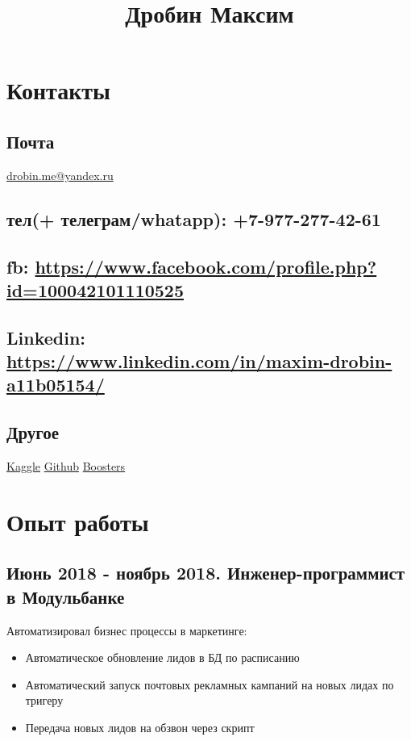 \documentclass[11pt]{article}
\date{}
\title{Дробин Максим}
\begin{document}
\maketitle
\section{Контакты}
\label{sec:org25c2c82}
\subsection{Почта}
\label{sec:orgaffa8a4}
\href{mailto:drobin.me@yandex.ru}{drobin.me@yandex.ru}

\subsection{тел(+ телеграм/whatapp): +7-977-277-42-61}
\label{sec:org64386a6}
\subsection{fb: \url{https://www.facebook.com/profile.php?id=100042101110525}}
\label{sec:org4a47960}
\subsection{Linkedin: \url{https://www.linkedin.com/in/maxim-drobin-a11b05154/}}
\label{sec:org5e46e2b}
\subsection{Другое}
\label{sec:orga355af7}
\href{https://www.kaggle.com/malahai}{Kaggle}
\href{https://github.com/gazon1/}{Github}
\href{https://boosters.pro/user/Malahai}{Boosters}
\section{Опыт работы}
\label{sec:org8594642}
\subsection{Июнь 2018 - ноябрь 2018. Инженер-программист в Модульбанке}
\label{sec:orgbd03b36}
Автоматизировал бизнес процессы в маркетинге: 
\begin{itemize}
\item Автоматическое обновление лидов в БД по расписанию
\item Автоматический запуск почтовых рекламных кампаний на новых лидах по тригеру
\item Передача новых лидов на обзвон через скрипт
\end{itemize}
\end{document}
